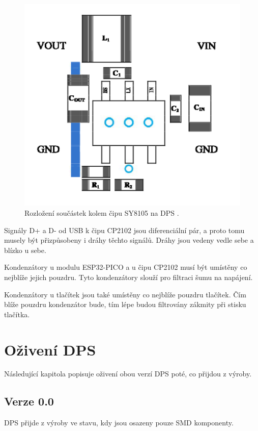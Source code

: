   \begin{figure}[!h]
    \begin{center}
      \includegraphics[scale=1]{obrazky/SY8105_rozlozeni_na_DPS.png}
    \end{center}
    \caption[Rozložení součástek kolem čipu SY8105 na DPS]{Rozložení součástek kolem čipu SY8105 na DPS \cite{SY8105_datasheet}.}
  \end{figure}

  Signály D+ a D- od USB k čipu CP2102 jsou diferenciální pár, a proto tomu musely být přizpůsobeny i dráhy těchto signálů. Dráhy 
  jsou vedeny vedle sebe a blízko u sebe.

  Kondenzátory u modulu ESP32-PICO a u čipu CP2102 musí být umístěny co nejblíže jejich pouzdru. Tyto kondenzátory slouží pro 
  filtraci šumu na napájení.

  Kondenzátory u tlačítek jsou také umístěny co nejblíže pouzdru tlačítek. Čím blíže pouzdru kondenzátor bude, tím lépe budou 
  filtrovány zákmity při stisku tlačítka.


  \chapter{Oživení DPS}
  Následující kapitola popisuje oživení obou verzí DPS poté, co přijdou z výroby.

  \section{Verze 0.0}
  DPS přijde z výroby ve stavu, kdy jsou osazeny pouze SMD komponenty. %

